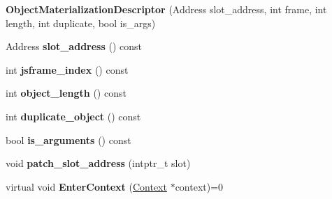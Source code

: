 \begin{DoxyCompactItemize}
\item 
\hypertarget{classv8_1_1internal_1_1_b_a_s_e___e_m_b_e_d_d_e_d_a9157f8a5bfeab25d90e0b8b8ab8eb5d2}{}{\bfseries Object\+Materialization\+Descriptor} (Address slot\+\_\+address, int frame, int length, int duplicate, bool is\+\_\+args)\label{classv8_1_1internal_1_1_b_a_s_e___e_m_b_e_d_d_e_d_a9157f8a5bfeab25d90e0b8b8ab8eb5d2}

\item 
\hypertarget{classv8_1_1internal_1_1_b_a_s_e___e_m_b_e_d_d_e_d_a1d2e02c60a438367bec78a4a820a92b0}{}Address {\bfseries slot\+\_\+address} () const \label{classv8_1_1internal_1_1_b_a_s_e___e_m_b_e_d_d_e_d_a1d2e02c60a438367bec78a4a820a92b0}

\item 
\hypertarget{classv8_1_1internal_1_1_b_a_s_e___e_m_b_e_d_d_e_d_a68f18f67aeeb77ef4589dac0b7421cb0}{}int {\bfseries jsframe\+\_\+index} () const \label{classv8_1_1internal_1_1_b_a_s_e___e_m_b_e_d_d_e_d_a68f18f67aeeb77ef4589dac0b7421cb0}

\item 
\hypertarget{classv8_1_1internal_1_1_b_a_s_e___e_m_b_e_d_d_e_d_a57e08a9e20fe3f165cf21ad33ad596ba}{}int {\bfseries object\+\_\+length} () const \label{classv8_1_1internal_1_1_b_a_s_e___e_m_b_e_d_d_e_d_a57e08a9e20fe3f165cf21ad33ad596ba}

\item 
\hypertarget{classv8_1_1internal_1_1_b_a_s_e___e_m_b_e_d_d_e_d_a43a860802472ee228a92d0944bc6a871}{}int {\bfseries duplicate\+\_\+object} () const \label{classv8_1_1internal_1_1_b_a_s_e___e_m_b_e_d_d_e_d_a43a860802472ee228a92d0944bc6a871}

\item 
\hypertarget{classv8_1_1internal_1_1_b_a_s_e___e_m_b_e_d_d_e_d_ae4e24cbdea6788e52ab06fea8abcb4f2}{}bool {\bfseries is\+\_\+arguments} () const \label{classv8_1_1internal_1_1_b_a_s_e___e_m_b_e_d_d_e_d_ae4e24cbdea6788e52ab06fea8abcb4f2}

\item 
\hypertarget{classv8_1_1internal_1_1_b_a_s_e___e_m_b_e_d_d_e_d_a3574badca385f68b2f20cc9775e17094}{}void {\bfseries patch\+\_\+slot\+\_\+address} (intptr\+\_\+t slot)\label{classv8_1_1internal_1_1_b_a_s_e___e_m_b_e_d_d_e_d_a3574badca385f68b2f20cc9775e17094}

\item 
\hypertarget{classv8_1_1internal_1_1_b_a_s_e___e_m_b_e_d_d_e_d_a6d58b81fc01834b815693453f9547342}{}virtual void {\bfseries Enter\+Context} (\hyperlink{classv8_1_1internal_1_1_context}{Context} $\ast$context)=0\label{classv8_1_1internal_1_1_b_a_s_e___e_m_b_e_d_d_e_d_a6d58b81fc01834b815693453f9547342}


\end{DoxyCompactItemize}
